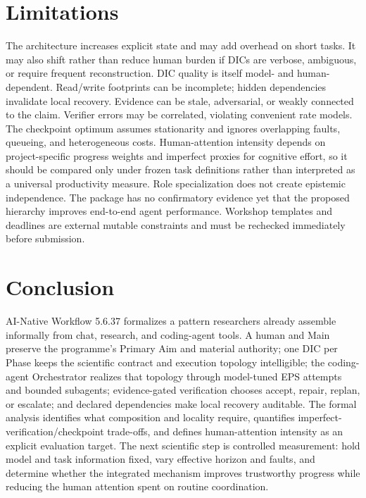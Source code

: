 \documentclass[11pt]{article}
\begin{document}
\section{Limitations}
The architecture increases explicit state and may add overhead on short tasks. It may also shift rather than reduce human burden if DICs are verbose, ambiguous, or require frequent reconstruction. DIC quality is itself model- and human-dependent. Read/write footprints can be incomplete; hidden dependencies invalidate local recovery. Evidence can be stale, adversarial, or weakly connected to the claim. Verifier errors may be correlated, violating convenient rate models. The checkpoint optimum assumes stationarity and ignores overlapping faults, queueing, and heterogeneous costs. Human-attention intensity depends on project-specific progress weights and imperfect proxies for cognitive effort, so it should be compared only under frozen task definitions rather than interpreted as a universal productivity measure. Role specialization does not create epistemic independence. The package has no confirmatory evidence yet that the proposed hierarchy improves end-to-end agent performance. Workshop templates and deadlines are external mutable constraints and must be rechecked immediately before submission.

\section{Conclusion}
AI-Native Workflow 5.6.37 formalizes a pattern researchers already assemble informally from chat, research, and coding-agent tools. A human and Main preserve the programme's Primary Aim and material authority; one DIC per Phase keeps the scientific contract and execution topology intelligible; the coding-agent Orchestrator realizes that topology through model-tuned EPS attempts and bounded subagents; evidence-gated verification chooses accept, repair, replan, or escalate; and declared dependencies make local recovery auditable. The formal analysis identifies what composition and locality require, quantifies imperfect-verification/checkpoint trade-offs, and defines human-attention intensity as an explicit evaluation target. The next scientific step is controlled measurement: hold model and task information fixed, vary effective horizon and faults, and determine whether the integrated mechanism improves trustworthy progress while reducing the human attention spent on routine coordination.

\appendix
\end{document}

